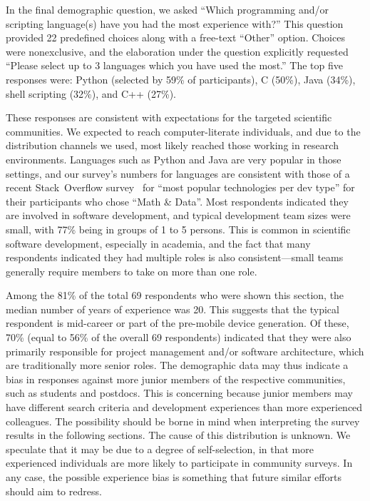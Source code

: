 \documentclass{casicswhitepaper}
\newcommand{\totalRespondents}{69\xspace}
\begin{document}
In the final demographic question, we asked ``Which programming and/or scripting language(s) have you had the most experience with?''  This question provided 22 predefined choices along with a free-text ``Other'' option.  Choices were nonexclusive, and the elaboration under the question explicitly requested ``Please select up to 3 languages which you have used the most.''   The top five responses were: Python (selected by 59\% of participants), C (50\%), Java (34\%), shell scripting (32\%), and C++ (27\%).

These responses are consistent with expectations for the targeted scientific communities.  We expected to reach computer-literate individuals, and due to the distribution channels we used, most likely reached those working in research environments.  Languages such as Python and Java are very popular in those settings, and our survey's numbers for languages are consistent with those of a recent Stack~Overflow survey~\cite{stackexchange2016survey} for ``most popular technologies per dev type'' for their participants who chose ``Math \& Data''.  Most respondents indicated they are involved in software development, and typical development team sizes were small, with 77\% being in groups of 1 to 5 persons.  This is common in scientific software development, especially in academia, and the fact that many respondents indicated they had multiple roles is also consistent---small teams generally require members to take on more than one role.


Among the 81\% of the total \totalRespondents respondents who were shown this section, the median number of years of experience was 20. This suggests that the typical respondent is mid-career or part of the pre-mobile device generation.  Of these, 70\% (equal to 56\% of the overall \totalRespondents respondents) indicated that they were also primarily responsible for project management and/or software architecture, which are traditionally more senior roles.  The demographic data may thus indicate a bias in responses against more junior members of the respective communities, such as students and postdocs.  This is concerning because junior members may have different search criteria and development experiences than more experienced colleagues. The possibility should be borne in mind when interpreting the survey results in the following sections. The cause of this distribution is unknown.  We speculate that it may be due to a degree of self-selection, in that more experienced individuals are more likely to participate in community surveys.  In any case, the possible experience bias is something that future similar efforts should aim to redress.
\end{document}
